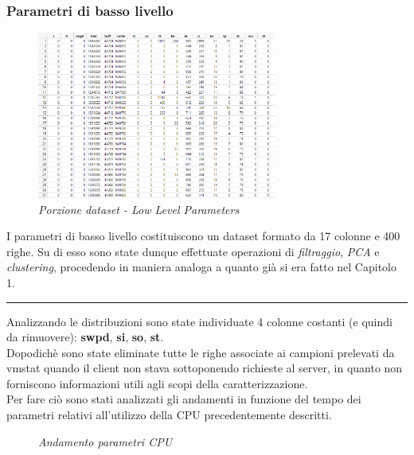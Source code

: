 \subsubsection{Parametri di basso livello}
\begin{figure}[H]
	\centering
	\includegraphics[width=0.7\textwidth]{img/hw3/porzione_lowlevel.png}
	\caption{\textit{Porzione dataset - Low Level Parameters}}
\end{figure}
I parametri di basso livello costituiscono un dataset formato da 17 colonne e 400 righe. Su di esso sono state dunque effettuate operazioni di \textit{filtraggio}, \textit{PCA} e \textit{clustering}, procedendo in maniera analoga a quanto già si era fatto nel Capitolo 1.
\\
\hrule
\vspace{0.3cm}
Analizzando le distribuzioni sono state individuate 4 colonne costanti (e quindi da rimuovere): \textbf{swpd}, \textbf{si}, \textbf{so}, \textbf{st}.
\\
Dopodichè sono state eliminate tutte le righe associate ai campioni prelevati da vmstat quando il client non stava sottoponendo richieste al server, in quanto non forniscono informazioni utili agli scopi della caratterizzazione.
\\
Per fare ciò sono stati analizzati gli andamenti in funzione del tempo dei parametri relativi all'utilizzo della CPU precedentemente descritti.
\begin{figure}[H]
	\caption{\textit{Andamento parametri CPU}}
\end{figure}
